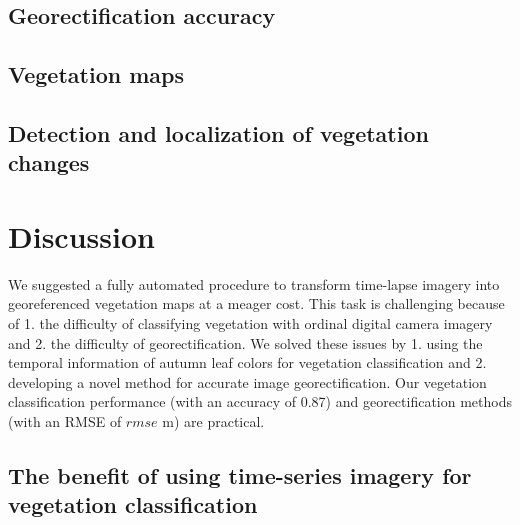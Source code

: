 \documentclass{article}
\begin{document}
\hypertarget{georectification-accuracy}{%
\subsection{Georectification accuracy}\label{georectification-accuracy}}

\hypertarget{vegetation-maps}{%
\subsection{Vegetation maps}\label{vegetation-maps}}

\hypertarget{detection-and-localization-of-vegetation-changes}{%
\subsection{Detection and localization of vegetation changes}\label{detection-and-localization-of-vegetation-changes}}

\hypertarget{discussion}{%
\section{Discussion}\label{discussion}}

We suggested a fully automated procedure to transform time-lapse imagery into georeferenced vegetation maps at a meager cost. This task is challenging because of 1. the difficulty of classifying vegetation with ordinal digital camera imagery and 2. the difficulty of georectification. We solved these issues by 1. using the temporal information of autumn leaf colors for vegetation classification and 2. developing a novel method for accurate image georectification. Our vegetation classification performance (with an accuracy of 0.87) and georectification methods (with an RMSE of \(rmse\) m) are practical.

\hypertarget{the-benefit-of-using-time-series-imagery-for-vegetation-classification}{%
\subsection{The benefit of using time-series imagery for vegetation classification}\label{the-benefit-of-using-time-series-imagery-for-vegetation-classification}}
\end{document}
